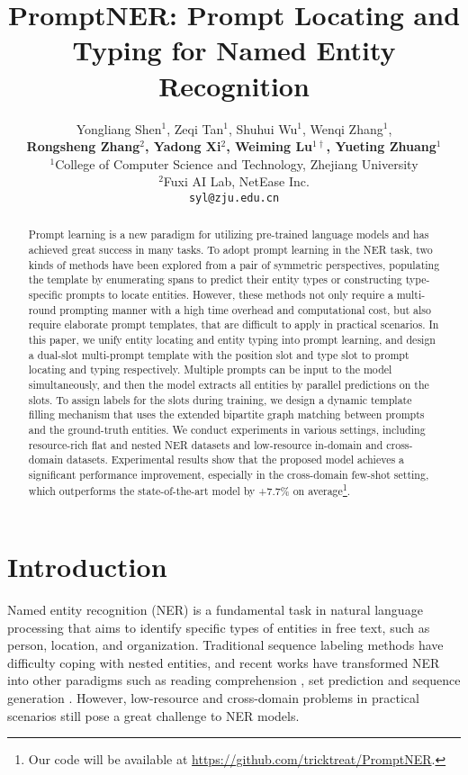 \documentclass[11pt]{article}
\title{PromptNER: Prompt Locating and Typing for Named Entity Recognition}
\author{
Yongliang Shen$^{1}$, Zeqi Tan$^{1}$, Shuhui Wu$^{1}$, Wenqi Zhang$^{1}$,\\ 
\textbf{Rongsheng Zhang$^{2}$, Yadong Xi$^{2}$, Weiming Lu$^{1\dagger}$, Yueting Zhuang$^{1}$}\\
$^{1}$College of Computer Science and Technology, Zhejiang University \\
$^{2}$Fuxi AI Lab, NetEase Inc.\\
\texttt{syl@zju.edu.cn}
}
\begin{document}
\maketitle
\renewcommand{\thefootnote}{\fnsymbol{footnote}}
\renewcommand{\thefootnote}{\arabic{footnote}}

\begin{abstract}

Prompt learning is a new paradigm for utilizing pre-trained language models and has achieved great success in many tasks. To adopt prompt learning in the NER task, two kinds of methods have been explored from a pair of symmetric perspectives, populating the template by enumerating spans to predict their entity types or constructing type-specific prompts to locate entities. However, these methods not only require a multi-round prompting manner with a high time overhead and computational cost, but also require elaborate prompt templates, that are difficult to apply in practical scenarios. In this paper, we unify entity locating and entity typing into prompt learning, and design a dual-slot multi-prompt template with the position slot and type slot to prompt locating and typing respectively. Multiple prompts can be input to the model simultaneously, and then the model extracts all entities by parallel predictions on the slots. To assign labels for the slots during training, we design a dynamic template filling mechanism that uses the extended bipartite graph matching between prompts and the ground-truth entities. We conduct experiments in various settings, including resource-rich flat and nested NER datasets and low-resource in-domain and cross-domain datasets. Experimental results show that the proposed model achieves a significant performance improvement, especially in the cross-domain few-shot setting, which outperforms the state-of-the-art model by +7.7\% on average\footnote{\;Our code will be available at \url{https://github.com/tricktreat/PromptNER}.}.


\end{abstract}

\section{Introduction}

Named entity recognition (NER) is a fundamental task in natural language processing that aims to identify specific types of entities in free text, such as person, location, and organization.
Traditional sequence labeling methods \citep{ma-hovy-2016-end} have difficulty coping with nested entities, and recent works have transformed NER into other paradigms such as reading comprehension \citep{li-etal-2020-unified, shen-etal-2022-parallel}, set prediction \citep{ijcai2021-542, ijcai2022-0613} and sequence generation \citep{tanl,yan-etal-2021-unified-generative,lu-etal-2022-unified}. However, low-resource and cross-domain problems in practical scenarios still pose a great challenge to NER models.
\end{document}
